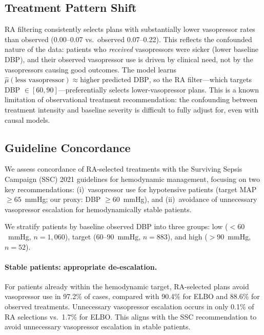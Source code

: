 \documentclass{article}
\begin{document}
\subsection{Treatment Pattern Shift}

RA filtering consistently selects plans with substantially lower vasopressor rates than observed (0.00--0.07 vs.\ observed 0.07--0.22). This reflects the confounded nature of the data: patients who \emph{received} vasopressors were sicker (lower baseline DBP), and their observed vasopressor use is driven by clinical need, not by the vasopressors causing good outcomes. The model learns $\hat{\mu}(\text{less vasopressor}) \approx \text{higher predicted DBP}$, so the RA filter---which targets DBP $\in [60,90]$---preferentially selects lower-vasopressor plans. This is a known limitation of observational treatment recommendation: the confounding between treatment intensity and baseline severity is difficult to fully adjust for, even with causal models.

\subsection{Guideline Concordance}
\label{sec:guideline_concordance}

We assess concordance of RA-selected treatments with the Surviving Sepsis Campaign (SSC) 2021 guidelines for hemodynamic management, focusing on two key recommendations: (i)~vasopressor use for hypotensive patients (target MAP $\geq 65$~mmHg; our proxy: DBP $\geq 60$~mmHg), and (ii)~avoidance of unnecessary vasopressor escalation for hemodynamically stable patients.

We stratify patients by baseline observed DBP into three groups: low ($< 60$~mmHg, $n = 1{,}060$), target ($60$--$90$~mmHg, $n = 883$), and high ($> 90$~mmHg, $n = 52$).

\paragraph{Stable patients: appropriate de-escalation.} For patients already within the hemodynamic target, RA-selected plans avoid vasopressor use in 97.2\% of cases, compared with 90.4\% for ELBO and 88.6\% for observed treatments. Unnecessary vasopressor escalation occurs in only 0.1\% of RA selections vs.\ 1.7\% for ELBO. This aligns with the SSC recommendation to avoid unnecessary vasopressor escalation in stable patients.
\end{document}
